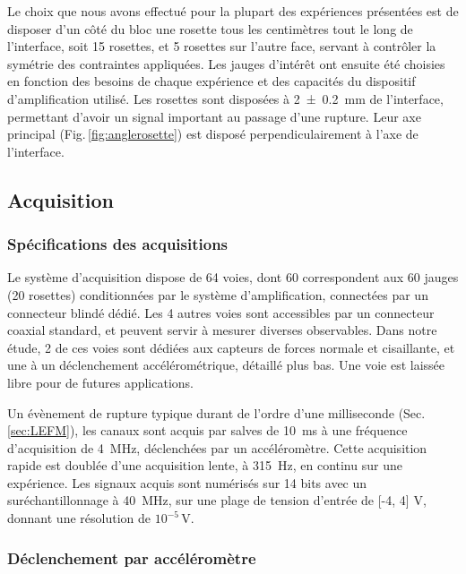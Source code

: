 Le choix que nous avons effectué pour la plupart des expériences présentées est de disposer d'un côté du bloc une rosette tous les centimètres tout le long de l'interface, soit 15 rosettes, et 5 rosettes sur l'autre face, servant à contrôler la symétrie des contraintes appliquées. Les jauges d'intérêt ont ensuite été choisies en fonction des besoins de chaque expérience et des capacités du dispositif d'amplification utilisé. Les rosettes sont disposées à \SI{2 +- 0.2}{\milli\meter} de l'interface, permettant d'avoir un signal important au passage d'une rupture.
Leur axe principal (Fig.\,\ref{fig:anglerosette}) est disposé perpendiculairement à l'axe de l'interface.


\subsection{Acquisition}


\subsubsection{Spécifications des acquisitions}

Le système d'acquisition dispose de 64 voies, dont 60 correspondent aux 60 jauges (20 rosettes) conditionnées par le système d'amplification, connectées par un connecteur blindé dédié. Les 4 autres voies sont accessibles par un connecteur coaxial standard, et peuvent servir à mesurer diverses observables. Dans notre étude, 2 de ces voies sont dédiées aux capteurs de forces normale et cisaillante, et une à un déclenchement accélérométrique, détaillé plus bas. Une voie est laissée libre pour de futures applications.

Un évènement de rupture typique durant de l'ordre d'une milliseconde (Sec.\,\ref{sec:LEFM}), les canaux sont acquis par salves de \SI{10}{\milli\second} à une fréquence d'acquisition de \SI{4}{\mega\hertz}, déclenchées par un accéléromètre. Cette acquisition rapide est doublée d'une acquisition lente, à \SI{315}{\hertz}, en continu sur une expérience. Les signaux acquis sont numérisés sur 14 bits avec un suréchantillonnage à \SI{40}{\mega\hertz}, sur une plage de tension d'entrée de [-4, 4] V, donnant une résolution de $10^{-5}\,\text{V}$.


\subsubsection{Déclenchement par accéléromètre}
\label{sec:accel}

